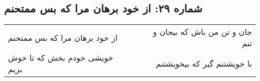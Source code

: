 \begin{center}
\section*{شماره ۲۹: از خود برهان مرا که بس ممتحنم}
\label{sec:029}
\begin{longtable}{l p{0.5cm} r}
از خود برهان مرا که بس ممتحنم
&&
جان و تن من باش که بیجان و تنم
\\
خویشی خودم بخش که تا خوش بزیم
&&
با خویشتنم گیر که بیخویشتنم
\\
\end{longtable}
\end{center}
